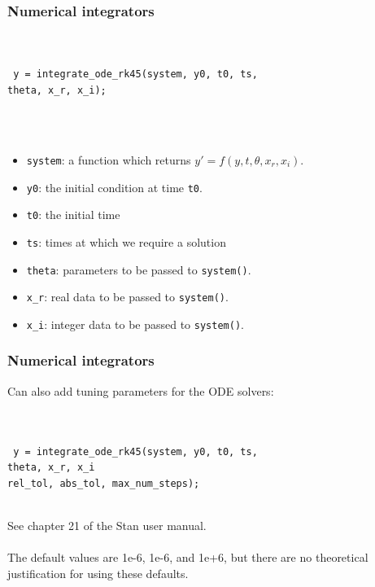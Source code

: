 \documentclass[xcolor=table]{beamer}
\begin{document}
\begin{frame}
  \frametitle{Numerical integrators}
  
  \ \\ \ \\
  
  \texttt{
    y = integrate\_ode\_rk45(system, y0, t0, ts, \\
    \hspace{4.5cm} theta, x\_r, x\_i);
  }
  
  \ \\ \ \\
  \begin{itemize}
    \item \texttt{system}: a function which returns $y' = f(y, t, \theta, x_r, x_i)$.
    \item \texttt{y0}: the initial condition at time \texttt{t0}.
    \item \texttt{t0}: the initial time
    \item \texttt{ts}: times at which we require a solution
    \item \texttt{theta}: parameters to be passed to \texttt{system()}.
    \item \texttt{x\_r}: real data to be passed to \texttt{system()}.
    \item \texttt{x\_i}: integer data to be passed to \texttt{system()}.
  \end{itemize}

\end{frame}

\begin{frame}
  \frametitle{Numerical integrators}
  
  Can also add tuning parameters for the ODE solvers:
  
  \ \\ \ \\
  
    \texttt{
    y = integrate\_ode\_rk45(system, y0, t0, ts, \\
    \hspace{4.5cm} theta, x\_r, x\_i \\
    \hspace{2.5cm} \textcolor{MRGGreen}{rel\_tol, abs\_tol, max\_num\_steps});
  }
  
  \ \\
  See chapter 21 of the Stan user manual. \\ \ \\
  The default values are 1e-6, 1e-6, and 1e+6, 
  but there are no theoretical justification for using these defaults.

\end{frame}
\end{document}
